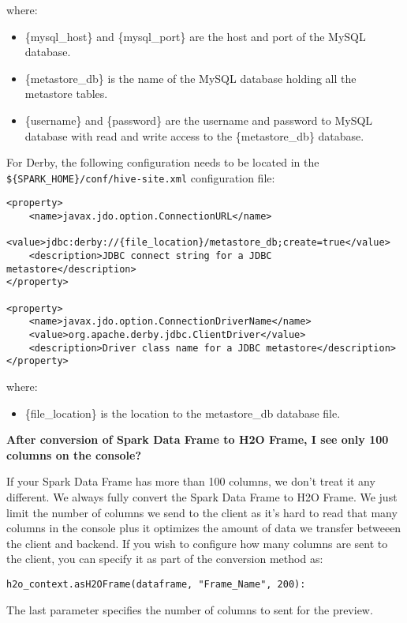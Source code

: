 where:
\begin{itemize}
\item \{mysql\_host\} and \{mysql\_port\} are the host and port of the MySQL database.
\item \{metastore\_db\} is the name of the MySQL database holding all the metastore tables.
\item \{username\} and \{password\} are the username and password to MySQL database with read and write access to the \{metastore\_db\} database.
\end{itemize}

For Derby, the following configuration needs to be located in the {\lstinline[style=Bash]|${SPARK_HOME}/conf/hive-site.xml|} configuration file:

\begin{lstlisting}[style=Bash]
<property>
    <name>javax.jdo.option.ConnectionURL</name>
    <value>jdbc:derby://{file_location}/metastore_db;create=true</value>
    <description>JDBC connect string for a JDBC metastore</description>
</property>

<property>
    <name>javax.jdo.option.ConnectionDriverName</name>
    <value>org.apache.derby.jdbc.ClientDriver</value>
    <description>Driver class name for a JDBC metastore</description>
</property>
\end{lstlisting}

where:
\begin{itemize}
\item \{file\_location\} is the location to the metastore\_db database file.
\end{itemize}

\textbf{After conversion of Spark Data Frame to H2O Frame, I see only 100 columns on the console?}

If your Spark Data Frame has more than 100 columns, we don't treat it any different. We always fully convert
the Spark Data Frame to H2O Frame. We just limit the number of columns we send to the client as it's hard to read that
many columns in the console plus it optimizes the amount of data we transfer betweeen the client and backend.
If you wish to configure how many columns are sent to the client, you can specify it as part of the conversion method as:

\begin{lstlisting}[style=Python]
h2o_context.asH2OFrame(dataframe, "Frame_Name", 200):
\end{lstlisting}

The last parameter specifies the number of columns to sent for the preview.

